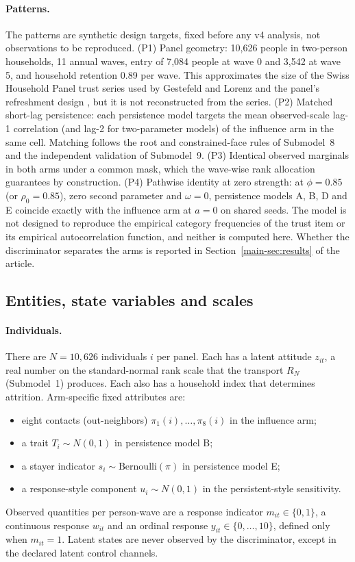 \paragraph{Patterns.}
The patterns are synthetic design targets, fixed before any v4 analysis, not observations to be reproduced. (P1) Panel geometry: 10,626 people in two-person households, 11 annual waves, entry of 7,084 people at wave 0 and 3,542 at wave 5, and household retention 0.89 per wave. This approximates the size of the Swiss Household Panel trust series used by Gestefeld and Lorenz \cite{gestefeld2023} and the panel's refreshment design \cite{voorpostel2025shp}, but it is not reconstructed from the series. (P2) Matched short-lag persistence: each persistence model targets the mean observed-scale lag-1 correlation (and lag-2 for two-parameter models) of the influence arm in the same cell. Matching follows the root and constrained-face rules of Submodel~8 and the independent validation of Submodel~9. (P3) Identical observed marginals in both arms under a common mask, which the wave-wise rank allocation guarantees by construction. (P4) Pathwise identity at zero strength: at $\phi=0.85$ (or $\rho_0=0.85$), zero second parameter and $\omega=0$, persistence models A, B, D and E coincide exactly with the influence arm at $a=0$ on shared seeds. The model is not designed to reproduce the empirical category frequencies of the trust item or its empirical autocorrelation function, and neither is computed here. Whether the discriminator separates the arms is reported in Section~\ref{main-sec:results} of the article.

\subsection{Entities, state variables and scales}

\paragraph{Individuals.}
There are $N=10{,}626$ individuals $i$ per panel. Each has a latent attitude $z_{it}$, a real number on the standard-normal rank scale that the transport $R_N$ (Submodel~1) produces. Each also has a household index that determines attrition. Arm-specific fixed attributes are:
\begin{itemize}
\item eight contacts (out-neighbors) $\pi_1(i),\ldots,\pi_8(i)$ in the influence arm;
\item a trait $T_i\sim N(0,1)$ in persistence model B;
\item a stayer indicator $s_i\sim\mathrm{Bernoulli}(\pi)$ in persistence model E;
\item a response-style component $u_i\sim N(0,1)$ in the persistent-style sensitivity.
\end{itemize}
Observed quantities per person-wave are a response indicator $m_{it}\in\{0,1\}$, a continuous response $w_{it}$ and an ordinal response $y_{it}\in\{0,\ldots,10\}$, defined only when $m_{it}=1$. Latent states are never observed by the discriminator, except in the declared latent control channels.

